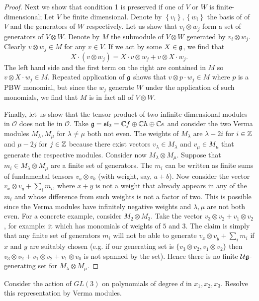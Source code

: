 \documentclass{../../mathnotes}
\begin{document}
\begin{proof}
    Next we show that condition 1 is preserved if one of $V$ or $W$ is finite-dimensional; Let $V$
    be finite dimensional. Denote by $\left\{ v_i \right\},\left\{ w_i \right\}$ the basis of
    of $V$ and the generators of $W$ respectively. Let us show that $v_i\otimes w_j$ form a set of
    generators of $V\otimes W$. Denote by $M$ the submodule of $V\otimes W$ generated by $v_i\otimes w_j$.
    Clearly $v\otimes w_j\in M$ for any $v\in V$. If we act by some $X\in\mathfrak g$, we find that 
    \[X\cdot (v\otimes w_j)=X\cdot v\otimes w_j+v\otimes X\cdot w_j.\]
    The left hand side and the first term on the right are contained in $M$ so $v\otimes X\cdot w_j\in M$.
    Repeated application of $\mathfrak g$ shows that $v\otimes p\cdot w_j\in M$ where $p$ is a PBW
    monomial, but since the $w_j$ generate $W$ under the application of such monomials, we
    find that $M$ is in fact all of $V\otimes W$.

    Finally, let us show that the tensor product of two infinite-dimensional modules in $\mathcal{O}$
    does not lie in $\mathcal{O}$. Take $\mathfrak g=\mathfrak{sl}_2=\mathbb{C} f\oplus\mathbb{C} h\oplus\mathbb{C} e$ and consider
    the two Verma modules $M_\lambda,M_\mu$ for $\lambda\neq\mu$ both not even. The weights of $M_\lambda$
    are $\lambda-2i$ for $i\in\mathbb{Z}$ and $\mu-2j$ for $j\in\mathbb{Z}$ because there exist vectors $v_\lambda\in M_\lambda$
    and $v_\mu\in M_\mu$ that generate the respective modules. Consider now $M_\lambda\otimes M_\mu$.
    Suppose that $m_i\in M_\lambda\otimes M_\mu$ are a finite set of generators. The $m_i$ can be
    written as finite sums of fundamental tensors $v_a\otimes v_b$ (with weight, say, $a+b$). Now 
    consider the vector $v_x\otimes v_y+\sum_i m_i$, where $x+y$ is not a weight that already appears in
    any of the $m_i$ and whose difference from such weights is not a factor of two. This is possible
    since the Verma modules have infinitely negative weights and $\lambda,\mu$ are not both even. For a
    concrete example, consider $M_2\otimes M_3$. Take the vector $v_3\otimes v_2+v_1\otimes v_2$,
    for example: it which has monomials of weights of $5$ and $3$. The claim is simply that
    any finite set of generators $m_i$ will not be able to generate $v_x\otimes v_y+\sum_i m_i$
    if $x$ and $y$ are suitably chosen (e.g. if our generating set is $\{v_3\otimes v_2,v_1\otimes v_2\}$
    then $v_3\otimes v_2+v_1\otimes v_2+v_1\otimes v_0$ is not spanned by the set). Hence there
    is no finite $\mathcal{U}\mathfrak{g}$-generating set for $M_\lambda\otimes M_\mu$.
\end{proof}



\begin{prop}
    Consider the action of $GL(3)$ on polynomials of degree $d$ in $x_1,x_2,x_3$.
    Resolve this representation by Verma modules.
\end{prop}
\end{document}
